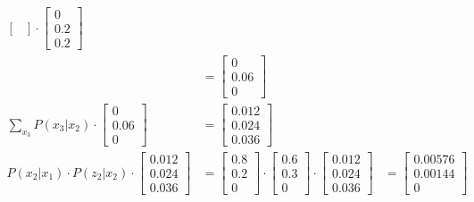 \documentclass[answers]{exam}
\begin{document}
\begin{questions}
\begin{parts}
\begin{solution}
\begin{align*}
\begin{bmatrix}
                                                                                                                    \end{bmatrix} \cdot \begin{bmatrix} 0 \\ 0.2 \\ 0.2 \end{bmatrix}                                                                                                                                                       \\ &= \begin{bmatrix} 0 \\ 0.06 \\ 0 \end{bmatrix} \\
                \sum_{x_3} P(x_3 | x_2) \cdot \begin{bmatrix} 0 \\ 0.06 \\ 0 \end{bmatrix}                      & = \begin{bmatrix} 0.012 \\ 0.024 \\ 0.036 \end{bmatrix}                                                                                                                                                                   \\
                P(x_{2} | x_1) \cdot P(z_{2} | x_2) \cdot \begin{bmatrix} 0.012 \\ 0.024 \\ 0.036 \end{bmatrix} & = \begin{bmatrix} 0.8 \\ 0.2 \\ 0 \end{bmatrix} \cdot \begin{bmatrix} 0.6 \\ 0.3 \\ 0 \end{bmatrix} \cdot \begin{bmatrix} 0.012 \\ 0.024 \\ 0.036 \end{bmatrix} & = \begin{bmatrix} 0.00576 \\ 0.00144 \\ 0 \end{bmatrix} \\
            \end{align*}


\end{solution}
\end{parts}
\end{questions}
\end{document}

